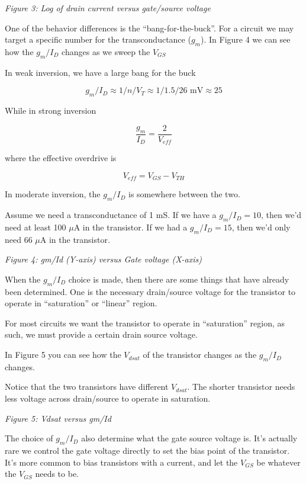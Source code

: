 {
\centering
{}
}

\emph{Figure 3: Log of drain current versus gate/source voltage }

One of the behavior differences is the ``bang-for-the-buck''. For a
circuit we may target a specific number for the transconductance
(\(g_m\)). In Figure 4 we can see how the \(g_m/I_D\) changes as we
sweep the \(V_{GS}\)

In weak inversion, we have a large bang for the buck

\[ g_m/I_D \approx 1/n/V_T \approx 1/1.5/26\text{ mV} \approx 25\]

While in strong inversion

\[ \frac{g_m}{I_D} = \frac{2}{V_{eff}}\]

where the effective overdrive is

\[V_{eff} = V_{GS} - V_{TH}\]

In moderate inversion, the \(g_m/I_D\) is somewhere between the two.

Assume we need a transconductance of 1 mS. If we have a
\(g_m/I_D = 10\), then we'd need at least 100 \(\mu\)A in the
transistor. If we had a \(g_m/I_D = 15\), then we'd only need 66
\(\mu\)A in the transistor.


{
\centering
{}
}

\emph{Figure 4: gm/Id (Y-axis) versus Gate voltage (X-axis) }

When the \(g_m/I_D\) choice is made, then there are some things that
have already been determined. One is the necessary drain/source voltage
for the transistor to operate in ``saturation'' or ``linear'' region.

For most circuits we want the transistor to operate in ``saturation''
region, as such, we must provide a certain drain source voltage.

In Figure 5 you can see how the \(V_{dsat}\) of the transistor changes
as the \(g_m/I_D\) changes.

Notice that the two transistors have different \(V_{dsat}\). The shorter
transistor needs less voltage across drain/source to operate in
saturation.


{
\centering
{}
}

\emph{Figure 5: Vdsat versus gm/Id }

The choice of \(g_m/I_D\) also determine what the gate source voltage
is. It's actually rare we control the gate voltage directly to set the
bias point of the transistor. It's more common to bias transistors with
a current, and let the \(V_{GS}\) be whatever the \(V_{GS}\) needs to
be.

